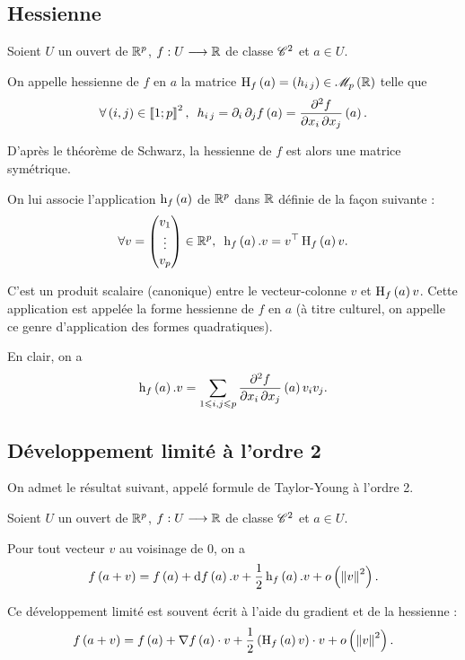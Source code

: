 \subsection{Hessienne}

\begin{defi}
Soient \(U\) un ouvert de \(\mathbb{R}^p\), \(f:U\longrightarrow\mathbb{R}\) de classe \(\mathscr{C}^{2}\) et \(a\in U\).

On appelle hessienne de \(f\) en \(a\) la matrice \(\hessienne{f}\paren{a}=\paren{h_{i\,j}}\in\M{p}[\R]\) telle que \[\quantifs{\forall\paren{i,j}\in\interventierii{1}{p}^2}h_{i\,j}=\pdif{i}\pdif{j}f\paren{a}=\pdv{f}{x_i,x_j}\paren{a}.\]
\end{defi}

D'après le théorème de Schwarz, la hessienne de \(f\) est alors une matrice symétrique.

On lui associe l'application \(\operatorname{h}_{f}\left(a\right)\) de \(\mathbb{R}^p\) dans \(\mathbb{R}\) définie de la façon suivante : \[\quantifs{\forall v=\tcoords{v_1}{\vdots}{v_p}\in\R^p}\formehessienne{f}\paren{a}.v=\trans{v}\hessienne{f}\paren{a}v.\]

C'est un produit scalaire (canonique) entre le vecteur-colonne \(v\) et \(\operatorname{H}_{f}\left(a\right)v\). Cette application est appelée la forme hessienne de \(f\) en \(a\) (à titre culturel, on appelle ce genre d'application des formes quadratiques).

En clair, on a \[\operatorname{h}_{f}\left(a\right).v=\sum_{1\leqslant i,j\leqslant p}\pdv{f}{x_i,x_j}\left(a\right)v_iv_j.\]

\subsection{Développement limité à l'ordre 2}

On admet le résultat suivant, appelé formule de Taylor-Young à l'ordre 2.

\begin{prop}
Soient \(U\) un ouvert de \(\mathbb{R}^p\), \(f:U\longrightarrow\mathbb{R}\) de classe \(\mathscr{C}^{2}\) et \(a\in U\).

Pour tout vecteur \(v\) au voisinage de \(0\), on a \[f\paren{a+v}=f\paren{a}+\odif{f}\paren{a}.v+\dfrac{1}{2}\formehessienne{f}\paren{a}.v+\o{\norme{v}^2}.\]
\end{prop}

Ce développement limité est souvent écrit à l'aide du gradient et de la hessienne : \[f\paren{a+v}=f\paren{a}+\nabla f\paren{a}\scal v+\dfrac{1}{2}\paren{\hessienne{f}\paren{a}v}\scal v+\o{\norme{v}^2}.\]

